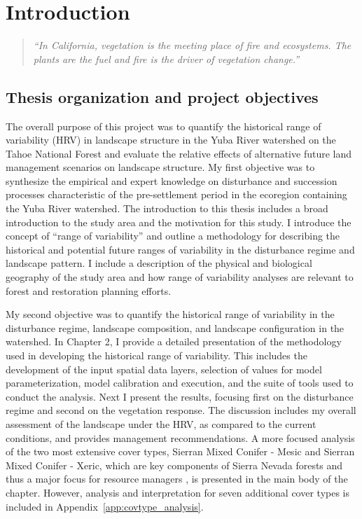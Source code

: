 
\chapter{Introduction} %
\label{CH1}

\begin{quote}
\emph{“In California, vegetation is the meeting place of fire and ecosystems. The plants are the fuel and fire is the driver of vegetation change.”} \\
\end{quote}

\section{Thesis organization and project objectives}

The overall purpose of this project was to quantify the historical range of variability (HRV) in landscape structure in the Yuba River watershed on the Tahoe National Forest and evaluate the relative effects of alternative future land management scenarios on landscape structure. My first objective was to synthesize the empirical and expert knowledge on disturbance and succession processes characteristic of the pre-settlement period in the ecoregion containing the Yuba River watershed. The introduction to this thesis includes a broad introduction to the study area and the motivation for this study. I introduce the concept of ``range of variability'' and outline a methodology for describing the historical and potential future ranges of variability in the disturbance regime and landscape pattern. I include a description of the physical and biological geography of the study area and how range of variability analyses are relevant to forest and restoration planning efforts. 

My second objective was to quantify the historical range of variability in the disturbance regime, landscape composition, and landscape configuration in the watershed. In Chapter 2, I provide a detailed presentation of the methodology used in developing the historical range of variability. This includes the development of the input spatial data layers, selection of values for model parameterization, model calibration and execution, and the suite of tools used to conduct the analysis. Next I present the results, focusing first on the disturbance regime and second on the vegetation response. The discussion includes my overall assessment of the landscape under the HRV, as compared to the current conditions, and provides management recommendations. A more focused analysis of the two most extensive cover types, Sierran Mixed Conifer - Mesic and Sierran Mixed Conifer - Xeric, which are key components of Sierra Nevada forests and thus a major focus for resource managers \citep{North2010}, is presented in the main body of the chapter. However, analysis and interpretation for seven additional cover types is included in Appendix~\ref{app:covtype_analysis}. 

